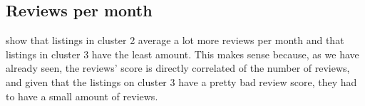 \clearpage
\subsection{Reviews per month}%


 show that listings in cluster 2 average a lot more reviews per month and that listings in
cluster 3 have the least amount. This makes sense because, as we have already seen, the reviews' score is directly correlated of the number of reviews, and given that the listings on cluster 3 have a pretty bad review score, they had to have a small amount of reviews.






